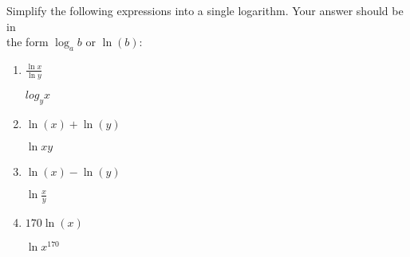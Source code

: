 \documentclass[11pt]{article}
\begin{document}
\begin{subparts}
    \item Simplify the following expressions into a single logarithm. Your answer should be in \\
    the form $\log_a{b}$ or $\ln(b)$:
    \begin{enumerate}[(i.)]
        \item $\frac{\ln x}{\ln y}$ \par  
        \begin{solution}
            $log_y{x}$ 
        \end{solution} 
        \item $\ln(x)+\ln(y)$ \par
        \begin{solution}
            $\ln xy$
        \end{solution}
        \item $\ln(x)-\ln(y)$ \par
        \begin{solution}
            $\ln \frac{x}{y}$
        \end{solution}
        \item $170\ln(x)$ \par
        \begin{solution}
            $\ln x^{170}$
        \end{solution}
    \end{enumerate}


\end{subparts}
\end{document}
